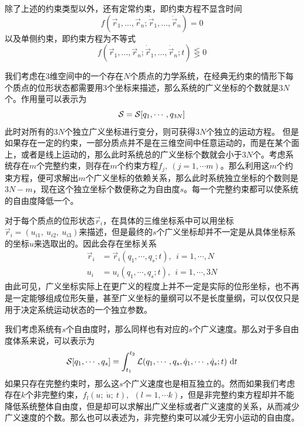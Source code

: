 除了上述的约束类型以外，还有定常约束，即约束方程不显含时间
\begin{equation}
    f(\vec r_1, \dots,\vec r_n;\dot{\vec{r}}_1, \dots,\dot{\vec{r}}_n)=0
\end{equation}
以及单侧约束，即约束方程为不等式
\begin{equation}
    f(\vec r_1, \dots,\vec r_n;\dot{\vec{r}}_1, \dots,\dot{\vec{r}}_n;t)\lesseqgtr 0
\end{equation}

我们考虑在3维空间中的一个存在$N$个质点的力学系统，在经典无约束的情形下每个质点的位形状态都需要用3个坐标来描述，那么系统的广义坐标的个数就是$3N$个。作用量可以表示为
\begin{equation}
    \mathcal{S} = \mathcal{S}[q_1,\cdots,q_{3N}]
\end{equation}
此时对所有的$3N$个独立广义坐标进行变分，则可获得$3N$个独立的运动方程。
但是如果存在一定的约束，一部分质点并不是在三维空间中任意运动的，而是在某个面上，或者是线上运动的，那么此时系统总的广义坐标个数就会小于$3N$个。考虑系统存在$m$个完整约束，则存在$m$个约束方程$f_j,~(j=1,\cdots m)$。那么利用这$m$个约束方程，便可求解出$m$个广义坐标的依赖关系，那么此时系统独立坐标的个数则是$3N-m$，现在这个独立坐标个数便称之为自由度$s$。每一个完整约束都可以使系统的自由度降低一个。

对于每个质点的位形状态$\vec{r}_i$，在具体的三维坐标系中可以用坐标$\vec{r}_i = (u_{i1},~ u_{i2},~u_{i3})$来描述，但是最终的$s$个广义坐标却并不一定是从具体坐标系的坐标$u$来选取出的。因此会存在坐标关系
\begin{align}
    \vec{r}_i &= \vec{r}_i(q_1,\cdots,q_s;t),~~i = 1,\cdots,N\\
    u_i &= u_i(q_1,\cdots,q_s;t),~~i = 1,\cdots,3N
\end{align}
由此可见，广义坐标实际上在更广义的程度上并不一定是实际的位形坐标，也不再是一定能够组成位形矢量，甚至广义坐标的量纲可以不是长度量纲，可以仅仅只是用于决定系统运动状态的一个独立参数。

我们考虑系统有$s$个自由度时，那么同样也有对应的$s$个广义速度。那么对于多自由度体系来说，可以表示为
\begin{equation}
    \mathcal{S} [q_1,\cdots,q_s] = \int_{t_1} ^{t_2} \mathcal{L}(q_1,\cdots,q_s,\dot{q}_1,\cdots,\dot q_s;t) ~\mathrm{d} t 
\end{equation}
如果只存在完整约束时，那么这$s$个广义速度也是相互独立的。然而如果我们考虑存在$k$个非完整约束，$f_l(u;~\dot u;~t),~~(l=1,\cdots k)$，但是非完整约束方程却并不能降低系统整体自由度，但是却可以求解出广义坐标或者广义速度的关系，从而减少广义速度的个数。那么也可以表述为，非完整约束可以减少无穷小运动的自由度。

